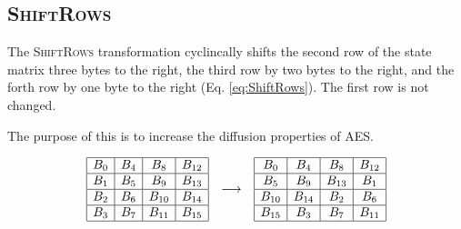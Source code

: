 \subsection{\textsc{ShiftRows}}

The \textsc{ShiftRows} transformation cyclincally shifts the second row of the state matrix three bytes to the right, the third row by two bytes to the right, and the forth row by one byte to the right (Eq. \ref{eq:ShiftRows}).
The first row is not changed.

The purpose of this is to increase the diffusion properties of AES.

\begin{equation}
    \begin{array}{c@{\quad \longrightarrow \quad}c}
        \begin{array}{|c|c|c|c|}
        \hline
        B_0 & B_4 & B_8 & B_{12} \\
        \hline
        B_1 & B_5 & B_9 & B_{13} \\
        \hline
        B_2 & B_6 & B_{10} & B_{14} \\
        \hline
        B_3 & B_7 & B_{11} & B_{15} \\
        \hline
        \end{array}
    &
    \begin{array}{|c|c|c|c|}
        \hline
        B_0 & B_4 & B_8 & B_{12} \\
        \hline
        B_5 & B_9 & B_{13} & B_1 \\
        \hline
        B_{10} & B_{14} & B_2 & B_6 \\
        \hline
        B_{15} & B_3 & B_7 & B_{11} \\
        \hline
        \end{array}
    \end{array}
    \label{eq:ShiftRows}
\end{equation}